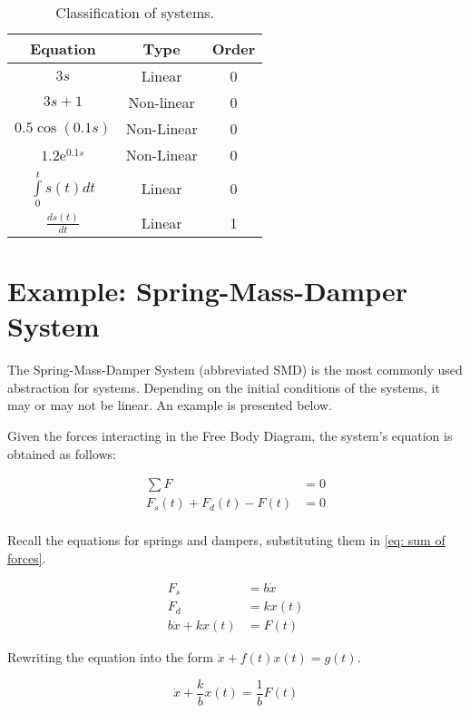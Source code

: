 \begin{table}[t]
\centering
\begin{tabular}{c|cc}
Equation & Type & Order\\
\hline
$3s$ & Linear & 0\\
$3s + 1$ & Non-linear & 0\\
$0.5 \cos (0.1 s)$ & Non-Linear & 0\\
$1.2 \mathrm{e}^{0.1s}$ & Non-Linear & 0\\
$\int\limits_0^{t} s(t)dt$ & Linear & 0\\
$\frac{d s(t)}{dt}$ & Linear & 1\\
\hline
\end{tabular}
\label{table: exercise 1 order}
\caption{Classification of systems.}
\end{table}

\section{Example: Spring-Mass-Damper System}

The Spring-Mass-Damper System (abbreviated SMD) is the most 
commonly used abstraction for systems. Depending on the 
initial conditions of the systems, it may or may not be 
linear. An example is presented below.

Given the forces interacting in the Free Body Diagram, the 
system's equation is obtained as follows:

\begin{equation}
 \begin{split}
  \sum F & = 0\\
  F_s(t) + F_d(t) - F(t) & = 0\\
 \end{split}
 \label{eq: sum of forces}
\end{equation}

Recall the equations for springs and dampers, substituting 
them in \ref{eq: sum of forces}.

\begin{equation*}
 \begin{split}
  F_s & = b \dot{x}\\
  F_d & = k x(t)\\
  b \dot{x} + k x(t) & = F(t)
 \end{split}
\end{equation*}

Rewriting the equation into the form $\dot x + f(t) x(t) = 
g(t)$.

\begin{equation}
 \dot{x} + \frac{k}{b} x(t) = \frac{1}{b} F(t)
 \label{eq: system equation}
\end{equation}

